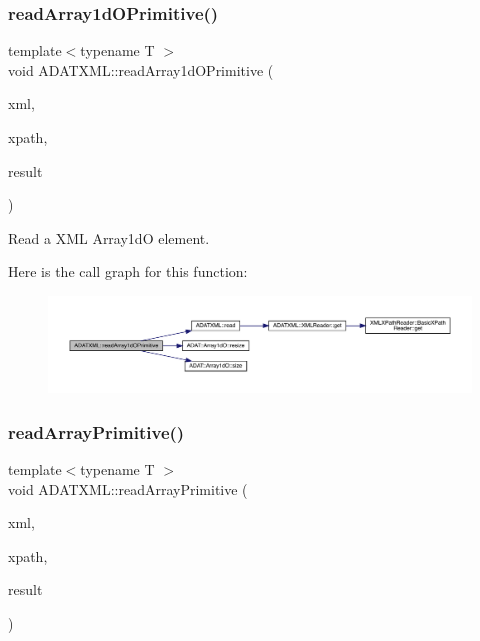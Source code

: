 \subsubsection{\texorpdfstring{readArray1dOPrimitive()}{readArray1dOPrimitive()}}
{\footnotesize\ttfamily template$<$typename T $>$ \\
void A\+D\+A\+T\+X\+M\+L\+::read\+Array1d\+O\+Primitive (\begin{DoxyParamCaption}\item[{\mbox{\hyperlink{classADATXML_1_1XMLReader}{X\+M\+L\+Reader}} \&}]{xml,  }\item[{const std\+::string \&}]{xpath,  }\item[{\mbox{\hyperlink{classADAT_1_1Array1dO}{A\+D\+A\+T\+::\+Array1dO}}$<$ T $>$ \&}]{result }\end{DoxyParamCaption})}



Read a X\+ML Array1dO element. 

Here is the call graph for this function\+:\nopagebreak
\begin{figure}[H]
\begin{center}
\leavevmode
\includegraphics[width=350pt]{d7/da0/namespaceADATXML_a0a1d6e8dcbf52e1413441824f0aa44e9_cgraph}
\end{center}
\end{figure}
\mbox{\label{namespaceADATXML_aaefbc18d9018a09271e0b949526730ab}} 
\subsubsection{\texorpdfstring{readArrayPrimitive()}{readArrayPrimitive()}}
{\footnotesize\ttfamily template$<$typename T $>$ \\
void A\+D\+A\+T\+X\+M\+L\+::read\+Array\+Primitive (\begin{DoxyParamCaption}\item[{\mbox{\hyperlink{classADATXML_1_1XMLReader}{X\+M\+L\+Reader}} \&}]{xml,  }\item[{const std\+::string \&}]{xpath,  }\item[{\mbox{\hyperlink{classXMLArray_1_1Array}{X\+M\+L\+Array\+::\+Array}}$<$ T $>$ \&}]{result }\end{DoxyParamCaption})}



